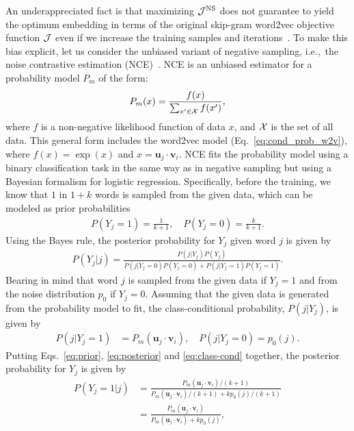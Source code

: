 \documentclass[12pt,a4paper]{article}
\newcommand{\vect}[1]{\boldsymbol{#1}}
\def\ie{i.e.,~}
\begin{document}
An underappreciated fact is that maximizing ${\cal J}^{\text{NS}}$ does not guarantee
to yield the optimum embedding in terms of the original skip-gram word2vec objective function ${\cal J}$ even if we increase the training samples and iterations~\autocite{Chia2010,Dyer2014}.
To make this bias explicit, let us consider the unbiased variant of negative sampling, \ie the noise contrastive estimation (NCE)~\autocite{Chia2010,Dyer2014}.
NCE is an unbiased estimator for a probability model $P_m$ of the form:
\begin{align}
	\label{eq:nce-model}
	P_m(x) = \frac{ f(x) }{\sum_{ x' \in {\cal X}} f(x') },
\end{align}
where $f$ is a non-negative likelihood function of data $x$, and ${\cal X}$ is the set of all data.
This general form includes the word2vec model (Eq.~\eqref{eq:cond_prob_w2v}), where $f(x) = \exp(x)$ and $x = \vect{u}_j \cdot \vect{v}_{i}$.
NCE fits the probability model using a binary classification task in the same way as in negative sampling but using a Bayesian formalism for logistic regression.
Specifically, before the training, we know that $1$ in $1+k$ words is sampled from the given data, which can be modeled as prior probabilities
\begin{align}
	\label{eq:prior}
	P(Y_{j} = 1) = \frac{1}{k + 1},\quad P(Y_{j} = 0) = \frac{k}{k + 1}.
\end{align}
Using the Bayes rule, the posterior probability for $Y_{j}$ given word $j$ is given by
\begin{align}
	\label{eq:posterior}
	P\left(Y_{j} \vert j\right) = \frac{
		P\left(j \vert Y_{j}\right)P(Y_{j})
	}{
		P\left(j \vert Y_{j} = 0\right)P(Y_{j} = 0)
		+ P\left(j \vert Y_{j} = 1\right)P(Y_{j} = 1)
	}.
\end{align}
Bearing in mind that word $j$ is sampled from the given data if $Y_{j}=1$ and from the noise distribution $p_0$ if $Y_j = 0$.
Assuming that the given data is generated from the probability model to fit, the class-conditional probability, $P\left(j \vert Y_{j}\right)$, is given by
\begin{align}
	\label{eq:class-cond}
	P(j \vert Y_{j} = 1) & = P_m(\vect{u}_j \cdot \vect{v}_{i}),
	\quad
	P(j \vert Y_{j} = 0)  = p_0 (j).
\end{align}
Putting Eqs.~\eqref{eq:prior}, \eqref{eq:posterior} and \eqref{eq:class-cond} together, the posterior probability for $Y_j$ is given by
\begin{align}
	\label{eq:nce}
	P\left(Y_{j} = 1 \vert j\right) & =
	\frac{
		P_m(\vect{u}_j \cdot \vect{v}_{i}) / (k + 1)
	}{
		P_m(\vect{u}_j \cdot \vect{v}_{i}) / (k + 1)  + kp_0(j) / (k + 1)
	}                                          \\
	                                & = \frac{
		P_m(\vect{u}_j \cdot \vect{v}_{i})
	}{
		P_m(\vect{u}_j \cdot \vect{v}_{i})  + kp_0(j)
	},
\end{align}
\end{document}

